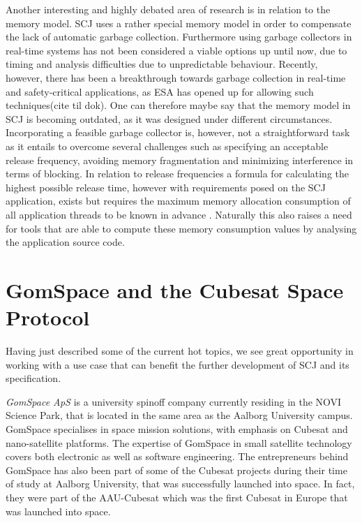 Another interesting and highly debated area of research is in relation to the memory model. SCJ uses a rather special memory model in order to compensate the lack of automatic garbage collection. Furthermore using garbage collectors in real-time systems has not been considered a viable options up until now, due to timing and analysis difficulties due to unpredictable behaviour. Recently, however, there has been a breakthrough towards garbage collection in real-time and safety-critical applications, as ESA has opened up for allowing such techniques(cite til dok). One can therefore maybe say that the memory model in SCJ is becoming outdated, as it was designed under different circumstances. Incorporating a feasible garbage collector is, however, not a straightforward task as it entails to overcome several challenges such as specifying an acceptable release frequency, avoiding memory fragmentation and minimizing interference in terms of blocking. In relation to release frequencies a formula for calculating the highest possible release time, however with requirements posed on the SCJ application, exists but requires the maximum memory allocation consumption of all application threads to be known in advance \cite{Schoeberl:2007:GCS:1288940.1288953}. Naturally this also raises a need for tools that are able to compute these memory consumption values by analysing the application source code.

\section{GomSpace and the Cubesat Space Protocol} %
\label{sec:gomspace_and_the_cubesat_space_protocol}
Having just described some of the current hot topics, we see great opportunity in working with a use case that can benefit the further development of SCJ and its specification.

\textit{GomSpace ApS} is a university spinoff company currently residing in the NOVI Science Park, that is located in the same area as the Aalborg University campus. GomSpace specialises in space mission solutions, with emphasis on Cubesat and nano-satellite platforms\cite{GomSpace}. The expertise of GomSpace in small satellite technology covers both electronic as well as software engineering. The entrepreneurs behind GomSpace has also been part of some of the Cubesat projects during their time of study at Aalborg University, that was successfully launched into space. In fact, they were part of the AAU-Cubesat which was the first Cubesat in Europe that was launched into space.

